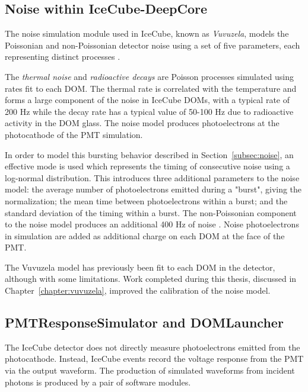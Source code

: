 \subsection{Noise within IceCube-DeepCore}
\label{subsec:noise_sim}
The noise simulation module used in IceCube, known as \emph{Vuvuzela}, models the Poissonian and non-Poissonian detector noise using a set of five  parameters, each representing distinct processes \cite{Thesis-Vuvuzela, Description-IceCube}. 

The \emph{thermal noise} and \emph{radioactive decays} are Poisson processes simulated using rates fit to each DOM.
The thermal rate is correlated with the temperature and forms a large component of the noise in IceCube DOMs, with a typical rate of 200 Hz while the decay rate has a typical value of 50-100 Hz due to radioactive activity in the DOM glass.
The noise model produces photoelectrons at the photocathode of the PMT simulation.

In order to model this bursting behavior described in Section~\ref{subsec:noise}, an effective mode is used which represents the timing of consecutive noise  using a log-normal distribution. 
This introduces three additional parameters to the noise model: the average number of photoelectrons emitted during a "burst", giving the normalization; the mean time between photoelectrons within a burst; and the standard deviation of the timing within a burst. 
The non-Poissonian component to the noise model produces an additional 400 Hz of noise \cite{Thesis-Vuvuzela}.
Noise photoelectrons in simulation are added as additional charge on each DOM at the face of the PMT.

The Vuvuzela model has previously been fit to each DOM in the detector, although with some limitations. 
Work completed during this thesis, discussed in Chapter~\ref{chapter:vuvuzela}, improved the calibration of the noise model.

\subsection{PMTResponseSimulator and DOMLauncher}
\label{subsec:pmtsim}
The IceCube detector does not directly measure photoelectrons emitted from the photocathode. 
Instead, IceCube events record the voltage response from the PMT via the output waveform.
The production of simulated waveforms from incident photons is produced by a pair of software modules.

